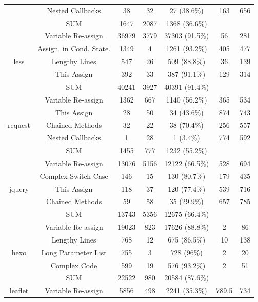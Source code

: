 {\begin{table}[!htbp]
\begin{tabular}{c|c|c|c|c|c|c}
		& Nested Callbacks & 38 & 32 & 27 (38.6\%) & 163 & 656 \\ \cline{2-7}
		& SUM & 1647 & 2087 & 1368 (36.6\%) & & \\ \hline
		\multirow{5}{*}{less}
		& Variable Re-assign & 36979 & 3779 & 37303 (91.5\%) & 56 & 281 \\ \cline{2-7}
		& Assign. in Cond. State. & 1349 & 4 & 1261 (93.2\%) & 405 & 477 \\ \cline{2-7}
		& Lengthy Lines & 547 & 26 & 509 (88.8\%) & 36 & 139 \\ \cline{2-7}
		& This Assign & 392 & 33 & 387 (91.1\%) & 129 & 314 \\ \cline{2-7}
		& SUM & 40241 & 3927 & 40391 (91.4\%) & & \\ \hline
		\multirow{5}{*}{request}
		& Variable Re-assign & 1362 & 667 & 1140 (56.2\%) & 365 & 534 \\ \cline{2-7}
		& This Assign & 28 & 50 & 34 (43.6\%) & 874 & 743 \\ \cline{2-7}
		& Chained Methods & 32 & 22 & 38 (70.4\%) & 256 & 557 \\ \cline{2-7}
		& Nested Callbacks & 1 & 28 & 1 (3.4\%) & 774 & 592 \\ \cline{2-7}
		& SUM & 1455 & 777 & 1232 (55.2\%) & & \\ \hline
		\multirow{5}{*}{jquery}
		& Variable Re-assign & 13076 & 5156 & 12122 (66.5\%) & 528 & 694 \\ \cline{2-7}
		& Complex Switch Case & 146 & 15 & 130 (80.7\%) & 179 & 435 \\ \cline{2-7}
		& This Assign & 118 & 37 & 120 (77.4\%) & 539 & 716 \\ \cline{2-7}
		& Chained Methods & 59 & 58 & 35 (29.9\%) & 657 & 785 \\ \cline{2-7}
		& SUM & 13743 & 5356 & 12675 (66.4\%) & & \\ \hline
		\multirow{5}{*}{hexo}
		& Variable Re-assign & 19023 & 823 & 17626 (88.8\%) & 2 & 86 \\ \cline{2-7}
		& Lengthy Lines & 768 & 12 & 675 (86.5\%) & 10 & 138 \\ \cline{2-7}
		& Long Parameter List & 755 & 3 & 728 (96\%) & 2 & 20 \\ \cline{2-7}
		& Complex Code & 599 & 19 & 576 (93.2\%) & 2 & 51 \\ \cline{2-7}
		& SUM & 22522 & 980 & 20584 (87.6\%) & & \\ \hline
		\multirow{5}{*}{leaflet}
		& Variable Re-assign & 5856 & 498 & 2241 (35.3\%) & 789.5 & 734 \\ \cline{2-7}

\end{tabular}
\end{table}}
